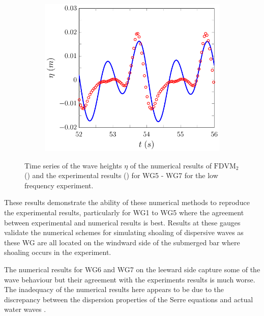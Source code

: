 \begin{figure}
\begin{subfigure}{0.5\textwidth}
		\vspace{0.5cm}
	\end{subfigure}
	\begin{subfigure}{0.5\textwidth}
		\includegraphics[width=\textwidth]{./chp6/figures/Experiment/Beji/sl/FDVMWG7.pdf}
		\vspace{0.5cm}
	\end{subfigure}
	\caption{Time series of the wave heights $\eta$ of the numerical results of $\text{FDVM}_2$ ({\color{blue}\solidrule}) and the experimental results () for WG5 - WG7 for the low frequency experiment.}
	\label{fig:BejislWG5to7FDVM}
\end{figure}

These results demonstrate the ability of these numerical methods to reproduce the experimental results, particularly for WG1 to WG5 where the agreement between experimental and numerical results is best. Results at these gauges validate the numerical schemes for simulating shoaling of dispersive waves as these WG are all located on the windward side of the submerged bar where shoaling occurs in the experiment. 

The numerical results for WG6 and WG7 on the leeward side capture some of the wave behaviour but their agreement with the experiments results is much worse. The inadequacy of the numerical results here appears to be due to the discrepancy between the dispersion properties of the Serre equations and actual water waves \cite{Beji-Battjes-1994-1,Lannes-2013}.

